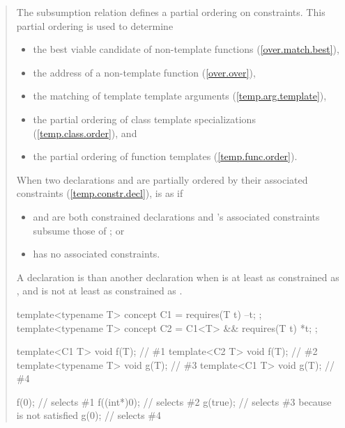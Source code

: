 \begin{quote}
\begin{addedblock}
\pnum
\enternote
The subsumption relation defines a partial ordering on constraints. 
This partial ordering is used to determine
% 
\begin{itemize}
\item the best viable candidate of non-template functions
     (\ref{over.match.best}), 
\item the address of a non-template function
     (\ref{over.over}), 
\item the matching of template template arguments
     (\ref{temp.arg.template}), 
\item the partial ordering of class template specializations
     (\ref{temp.class.order}), and
\item the partial ordering of function templates
     (\ref{temp.func.order}).
\end{itemize}
\exitnote

\pnum
When two declarations  and  are
partially ordered by their associated constraints (\ref{temp.constr.decl}), 
 is  as  if
% 
\begin{itemize}
\item {} and  are both constrained declarations and 
's associated constraints subsume those of ; or

\item {} has no associated constraints.
\end{itemize}

\pnum
A declaration  is 
than another declaration  when  is at least as
constrained as , and  is not at least as
constrained as .

\enterexample
\begin{codeblock}
template<typename T> concept C1 = requires(T t) { --t; };
template<typename T> concept C2 = C1<T> && requires(T t) { *t; };

template<C1 T> void f(T);       // \#1
template<C2 T> void f(T);       // \#2
template<typename T> void g(T); // \#3
template<C1 T> void g(T);       // \#4

f(0);       // selects \#1
f((int*)0); // selects \#2
g(true);    // selects \#3 because  is not satisfied
g(0);       // selects \#4
\end{codeblock}
\exitexample

\end{addedblock}
\end{quote}
